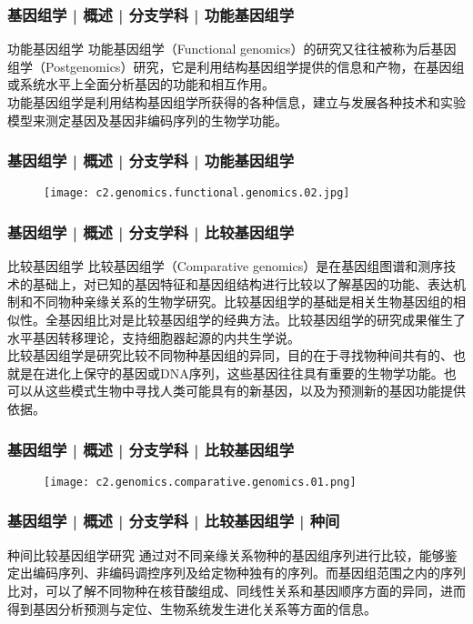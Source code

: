 \begin{frame}
  \frametitle{基因组学 | 概述 | 分支学科 | 功能基因组学}
  \begin{block}{功能基因组学}
功能基因组学（Functional genomics）的研究又往往被称为后基因组学（Postgenomics）研究，它是利用结构基因组学提供的信息和产物，在基因组或系统水平上全面分析基因的功能和相互作用。\\
\vspace{1em}
功能基因组学是利用结构基因组学所获得的各种信息，建立与发展各种技术和实验模型来测定基因及基因非编码序列的生物学功能。
  \end{block}
\end{frame}

\begin{frame}
  \frametitle{基因组学 | 概述 | 分支学科 | 功能基因组学}
  \begin{figure}
    \centering
    \texttt{[image: c2.genomics.functional.genomics.02.jpg]}
  \end{figure}
\end{frame}

\begin{frame}
  \frametitle{基因组学 | 概述 | 分支学科 | 比较基因组学}
  \begin{block}{比较基因组学}
比较基因组学（Comparative genomics）是在基因组图谱和测序技术的基础上，对已知的基因特征和基因组结构进行比较以了解基因的功能、表达机制和不同物种亲缘关系的生物学研究。比较基因组学的基础是相关生物基因组的相似性。全基因组比对是比较基因组学的经典方法。比较基因组学的研究成果催生了水平基因转移理论，支持细胞器起源的内共生学说。\\
\vspace{1em}
比较基因组学是研究比较不同物种基因组的异同，目的在于寻找物种间共有的、也就是在进化上保守的基因或DNA序列，这些基因往往具有重要的生物学功能。也可以从这些模式生物中寻找人类可能具有的新基因，以及为预测新的基因功能提供依据。
  \end{block}
\end{frame}

\begin{frame}
  \frametitle{基因组学 | 概述 | 分支学科 | 比较基因组学}
  \begin{figure}
    \centering
    \texttt{[image: c2.genomics.comparative.genomics.01.png]}
  \end{figure}
\end{frame}

\begin{frame}
  \frametitle{基因组学 | 概述 | 分支学科 | 比较基因组学 | 种间}
  \begin{block}{种间比较基因组学研究}
通过对不同亲缘关系物种的基因组序列进行比较，能够鉴定出编码序列、非编码调控序列及给定物种独有的序列。而基因组范围之内的序列比对，可以了解不同物种在核苷酸组成、同线性关系和基因顺序方面的异同，进而得到基因分析预测与定位、生物系统发生进化关系等方面的信息。
  \end{block}
\end{frame}

